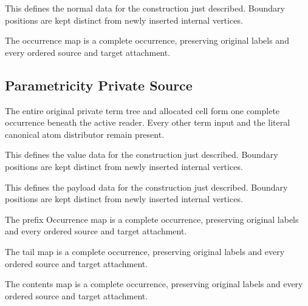 This defines the normal data for the construction just described. Boundary positions are kept distinct from newly inserted internal vertices.
\par{}

The occurrence map is a complete occurrence, preserving original labels and every ordered source and target attachment.
\par{}

\subsection{Parametricity Private Source}
The entire original private term tree and allocated cell form one complete occurrence beneath the active reader. Every other term input and the literal canonical atom distributor remain present.

This defines the value data for the construction just described. Boundary positions are kept distinct from newly inserted internal vertices.
\par{}

This defines the payload data for the construction just described. Boundary positions are kept distinct from newly inserted internal vertices.
\par{}

The prefix Occurrence map is a complete occurrence, preserving original labels and every ordered source and target attachment.
\par{}

The tail map is a complete occurrence, preserving original labels and every ordered source and target attachment.
\par{}

The contents map is a complete occurrence, preserving original labels and every ordered source and target attachment.
\par{}

